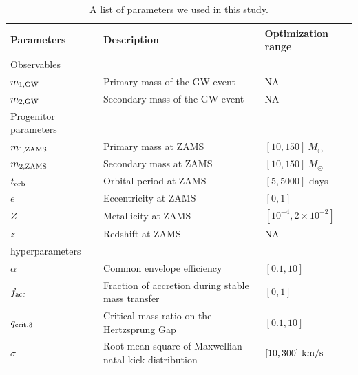 \documentclass[twocolumn]{aastex631}
\begin{document}
\begin{table}[hbt!]
    \begin{center}
    \begin{tabular}{ l l l }
    \hline
    \hline
    Parameters &  Description & Optimization range\\
    \hline
    \hline
    Observables &\ &\  \\
    \hline
    \hline
    $m_{\rm 1, GW}$ & Primary mass of the GW event & NA \\
    $m_{\rm 2, GW}$ & Secondary mass of the GW event  & NA\\
    \hline
    \hline
    Progenitor parameters &\ &\  \\
    \hline
    \hline
    $m_{\rm 1, ZAMS}$ & Primary mass at ZAMS & $[10,150]\ M_{\odot}$\\
    $m_{\rm 2, ZAMS}$ & Secondary mass at ZAMS & $[10,150]\ M_{\odot}$\\
    $t_{\rm orb}$ & Orbital period at ZAMS & $[5,5000]$ days\\
    $e$ & Eccentricity at ZAMS & $[0,1]$\\
    $Z$ & Metallicity at ZAMS & $[10^{-4},2\times10^{-2}]$\\
    $z$ & Redshift at ZAMS & NA\\
    \hline
    \hline
    hyperparameters &\ &\ \\
    \hline
    \hline
    
    $\alpha$ & Common envelope efficiency & $[0.1,10]$\\
    $f_{\rm acc}$ & Fraction of accretion during stable mass transfer & $[0,1]$\\
    $q_{\rm crit,3}$ & Critical mass ratio on the Hertzsprung Gap & $[0.1,10]$\\
    $\sigma$ & Root mean square of Maxwellian natal kick distribution& $[10,300]\ {\rm km/s}$\\


    \hline
    \hline
    \end{tabular}
    \caption{A list of parameters we used in this study.}
    \label{tab:parameters}
    \end{center}
\end{table}
\end{document}
